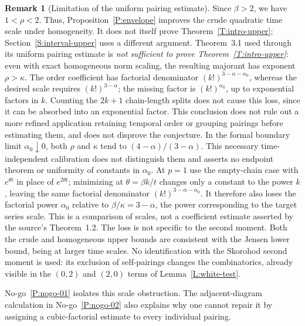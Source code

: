 \documentclass[12pt,oneside,openany]{book}
\numberwithin{equation}{section}
\theoremstyle{nogostyle}
\theoremstyle{definition}
\newtheorem{remark}[theorem]{Remark}
\begin{document}
\begin{remark}[Limitation of the uniform pairing estimate]\label{R:G0-verdict}
  Since $\beta > 2$, we have $1 < \rho < 2$. Thus, Proposition~\ref{P:envelope}
  improves the crude quadratic time scale under homogeneity. It does not itself
  prove Theorem~\ref{T:intro-upper}; Section~\ref{S:interval-upper} uses a different
  argument. Theorem~3.1 used through its uniform pairing estimate is \emph{not
  sufficient to prove Theorem~\ref{T:intro-upper}}: even with exact homogeneous norm scaling, the
  resulting majorant has exponent $\rho > \kappa$. The order coefficient has
  factorial denominator $(k!)^{3-\alpha-\alpha_0}$, whereas the desired scale
  requires $(k!)^{3-\alpha}$; the missing factor is $(k!)^{\alpha_0}$, up to
  exponential factors in $k$. Counting the $2k+1$ chain-length splits does not
  cause this loss, since it can be absorbed into an exponential factor. This
  conclusion does not rule out a more refined application retaining temporal
  order or grouping pairings before estimating them, and does not disprove the
  conjecture. In the formal boundary limit $\alpha_0\downarrow0$, both $\rho$
  and $\kappa$ tend to $(4-\alpha)/(3-\alpha)$. This necessary time-independent
  calibration does not distinguish them and asserts no endpoint theorem or
  uniformity of constants in $\alpha_0$. At $p = 1$ use the empty-chain case
  with $e^{\theta t}$ in place of $e^{2\theta t}$; minimizing at $\theta = \beta
  k/t$ changes only a constant to the power $k$, leaving the same factorial
  denominator $(k!)^{3-\alpha-\alpha_0}$. It therefore also loses the factorial
  power $\alpha_0$ relative to $\beta/\kappa = 3-\alpha$, the power
  corresponding to the target series scale. This is a comparison of scales, not
  a coefficient estimate asserted by the source's Theorem~1.2. The loss is not
  specific to the second moment. Both the crude and homogeneous upper bounds are
  consistent with the Jensen lower bound, being at larger time scales. No
  identification with the Skorohod second moment is used: its exclusion of
  self-pairings changes the combinatorics, already visible in the $(0,2)$ and
  $(2,0)$ terms of Lemma~\ref{L:white-test}.
\end{remark}

No-go~\ref{P:nogo-01} isolates this scale obstruction. The adjacent-diagram
calculation in No-go~\ref{P:nogo-02} also explains why one cannot repair it
by assigning a cubic-factorial estimate to every individual pairing.



\end{document}

